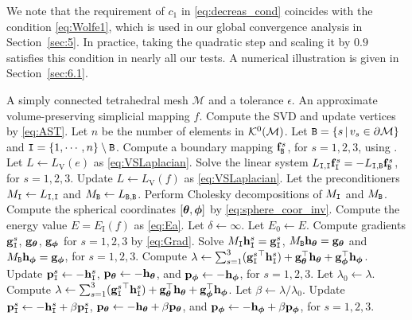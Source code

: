 \documentclass[11pt,a4paper]{article}
\begin{document}
We note that the requirement of $c_1$ in \eqref{eq:decreas_cond} coincides with the condition \eqref{eq:Wolfe1}, which is used in our global convergence analysis in Section~\ref{sec:5}. In practice, taking the quadratic step and scaling it by $0.9$ satisfies this condition in nearly all our tests. A numerical illustration is given in Section~\ref{sec:6.1}.


\begin{algorithm}
\caption{Preconditioned Nonlinear CG Method for IEM}
\label{alg:IEM}
\begin{algorithmic}[1]
\Require A simply connected tetrahedral mesh $\mathcal{M}$ and a tolerance $\epsilon$.
\Ensure An approximate volume-preserving simplicial mapping $f$.
\State Compute the SVD and update vertices by \eqref{eq:AST}.
\State Let $n$ be the number of elements in $\mathcal{K}^0(\mathcal{M})$.
\State Let $\mathtt{B} = \lbrace s \,|\, v_s \in \partial \mathcal{M} \rbrace$ and $\mathtt{I} = \lbrace 1, \cdots, n \rbrace \setminus \mathtt{B}$.
\State Compute a boundary mapping $\mathbf{f}_{\mathtt{B}}^s$, for $s = 1,2,3$, using \cite[Algorithm 4.3]{YuLL19}.
\State Let $L \gets L_\mathrm{V}(e)$ as \eqref{eq:VSLaplacian}.
    \State Solve the linear system $L_{\mathtt{I},\mathtt{I}} \mathbf{f}_{\mathtt{I}}^s  = -L_{\mathtt{I},\mathtt{B}} \mathbf{f}_{\mathtt{B}}^s$, for $s=1,2,3$.
    \State Update $L \gets L_\mathrm{V}(f)$ as \eqref{eq:VSLaplacian}.
\EndFor
\State Let the preconditioners $M_{\mathtt{I}} \gets L_{\mathtt{I},\mathtt{I}}$ and $M_{\mathtt{B}} \gets L_{\mathtt{B},\mathtt{B}}$.
\State Perform Cholesky decompositions of $M_{\mathtt{I}}$ and $M_{\mathtt{B}}$.
\State Compute the spherical coordinates $[{\boldsymbol{\theta}}, {\boldsymbol{\phi}}]$ by \eqref{eq:sphere_coor_inv}.
\State Compute the energy value $E = E_\mathrm{I}(f)$ as \eqref{eq:Ea}.
\State Let $\delta \leftarrow \infty$.
\While{$\delta > \epsilon$}
    \State Let $E_0 \leftarrow E$.
    \State Compute gradients $\mathbf{g}_{\mathtt{I}}^s$, $\mathbf{g}_{{\boldsymbol{\theta}}}$, $\mathbf{g}_{{\boldsymbol{\phi}}}$ for $s=1,2,3$ by \eqref{eq:Grad}.
    \State Solve $M_{\mathtt{I}} \mathbf{h}_{\mathtt{I}}^s = \mathbf{g}_{\mathtt{I}}^s$, $M_{\mathtt{B}} \mathbf{h}_{\boldsymbol{\theta}} = \mathbf{g}_{\boldsymbol{\theta}}$ and $M_{\mathtt{B}} \mathbf{h}_{\boldsymbol{\phi}} = \mathbf{g}_{\boldsymbol{\phi}}$, for $s=1,2,3$.
    \If {$\delta = \infty$}
        \State Compute $\lambda \leftarrow \sum_{s=1}^3 ({\mathbf{g}_{\mathtt{I}}^s}^\top \mathbf{h}_{\mathtt{I}}^s) + \mathbf{g}_{\boldsymbol{\theta}}^\top \mathbf{h}_{\boldsymbol{\theta}} + \mathbf{g}_{\boldsymbol{\phi}}^\top \mathbf{h}_{\boldsymbol{\phi}}$.
        \State Update $\mathbf{p}_{\mathtt{I}}^s \leftarrow - \mathbf{h}_{\mathtt{I}}^s$, $\mathbf{p}_{\boldsymbol{\theta}} \leftarrow - \mathbf{h}_{\boldsymbol{\theta}}$, and $\mathbf{p}_{\boldsymbol{\phi}} \leftarrow - \mathbf{h}_{\boldsymbol{\phi}}$, for $s=1,2,3$.
    \Else
        \State Let $\lambda_{0} \leftarrow \lambda$.
        \State Compute $\lambda \leftarrow \sum_{s=1}^3 ({\mathbf{g}_{\mathtt{I}}^s}^\top \mathbf{h}_{\mathtt{I}}^s) + \mathbf{g}_{\boldsymbol{\theta}}^\top \mathbf{h}_{\boldsymbol{\theta}} + \mathbf{g}_{\boldsymbol{\phi}}^\top \mathbf{h}_{\boldsymbol{\phi}}$.
        \State Let $\beta \leftarrow \lambda / \lambda_{0}.$
        \State Update $\mathbf{p}_{\mathtt{I}}^s \leftarrow - \mathbf{h}_{\mathtt{I}}^s + \beta \mathbf{p}_{\mathtt{I}}^s$, $\mathbf{p}_{\boldsymbol{\theta}} \leftarrow - \mathbf{h}_{\boldsymbol{\theta}} + \beta \mathbf{p}_{\boldsymbol{\theta}}$, and $\mathbf{p}_{\boldsymbol{\phi}} \leftarrow - \mathbf{h}_{\boldsymbol{\phi}} + \beta \mathbf{p}_{\boldsymbol{\phi}}$, for $s=1,2,3$.

\end{algorithmic}
\end{algorithm}
\end{document}
